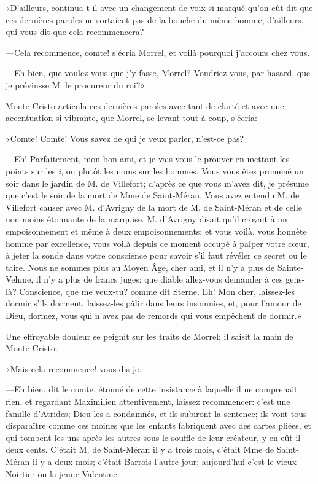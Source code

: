 «D'ailleurs, continua-t-il avec un changement de voix si marqué qu'on eût dit que ces dernières paroles ne sortaient pas de la bouche du même homme; d'ailleurs, qui vous dit que cela recommencera? 

—Cela recommence, comte! s'écria Morrel, et voilà pourquoi j'accours chez vous. 

—Eh bien, que voulez-vous que j'y fasse, Morrel? Voudriez-vous, par hasard, que je prévinsse M. le procureur du roi?» 

Monte-Cristo articula ces dernières paroles avec tant de clarté et avec une accentuation si vibrante, que Morrel, se levant tout à coup, s'écria: 

«Comte! Comte! Vous savez de qui je veux parler, n'est-ce pas? 

—Eh! Parfaitement, mon bon ami, et je vais vous le prouver en mettant les points sur les \textit{i}, ou plutôt les noms sur les hommes. Vous vous êtes promené un soir dans le jardin de M. de Villefort; d'après ce que vous m'avez dit, je présume que c'est le soir de la mort de Mme de Saint-Méran. Vous avez entendu M. de Villefort causer avec M. d'Avrigny de la mort de M. de Saint-Méran et de celle non moins étonnante de la marquise. M. d'Avrigny disait qu'il croyait à un empoisonnement et même à deux empoisonnements; et vous voilà, vous honnête homme par excellence, vous voilà depuis ce moment occupé à palper votre cœur, à jeter la sonde dans votre conscience pour savoir s'il faut révéler ce secret ou le taire. Nous ne sommes plus au Moyen Âge, cher ami, et il n'y a plus de Sainte-Vehme, il n'y a plus de francs juges; que diable allez-vous demander à ces gens-là? Conscience, que me veux-tu? comme dit Sterne. Eh! Mon cher, laissez-les dormir s'ils dorment, laissez-les pâlir dans leurs insomnies, et, pour l'amour de Dieu, dormez, vous qui n'avez pas de remords qui vous empêchent de dormir.» 

Une effroyable douleur se peignit sur les traits de Morrel; il saisit la main de Monte-Cristo. 

«Mais cela recommence! vous dis-je. 

—Eh bien, dit le comte, étonné de cette insistance à laquelle il ne comprenait rien, et regardant Maximilien attentivement, laissez recommencer: c'est une famille d'Atrides; Dieu les a condamnés, et ils subiront la sentence; ils vont tous disparaître comme ces moines que les enfants fabriquent avec des cartes pliées, et qui tombent les uns après les autres sous le souffle de leur créateur, y en eût-il deux cents. C'était M. de Saint-Méran il y a trois mois, c'était Mme de Saint-Méran il y a deux mois; c'était Barrois l'autre jour; aujourd'hui c'est le vieux Noirtier ou la jeune Valentine. 

